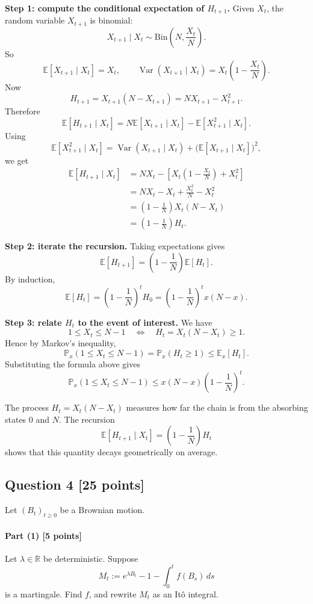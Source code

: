 \documentclass[11pt]{article}
\theoremstyle{definition}
\begin{document}
\textbf{Step 1: compute the conditional expectation of \(H_{t+1}\).}
Given \(X_t\), the random variable \(X_{t+1}\) is binomial:
\[
X_{t+1}\mid X_t \sim \mathrm{Bin}\!\left(N,\frac{X_t}{N}\right).
\]
So
\[
\mathbb E[X_{t+1}\mid X_t]=X_t,
\qquad
\operatorname{Var}(X_{t+1}\mid X_t)=X_t\left(1-\frac{X_t}{N}\right).
\]
Now
\[
H_{t+1}
=
X_{t+1}(N-X_{t+1})
=
N X_{t+1}-X_{t+1}^2.
\]
Therefore
\[
\mathbb E[H_{t+1}\mid X_t]
=
N\mathbb E[X_{t+1}\mid X_t]-\mathbb E[X_{t+1}^2\mid X_t].
\]
Using
\[
\mathbb E[X_{t+1}^2\mid X_t]
=
\operatorname{Var}(X_{t+1}\mid X_t)+\bigl(\mathbb E[X_{t+1}\mid X_t]\bigr)^2,
\]
we get
\begin{align*}
\mathbb E[H_{t+1}\mid X_t]
&=
N X_t-\left[X_t\left(1-\frac{X_t}{N}\right)+X_t^2\right] \\
&=
N X_t-X_t+\frac{X_t^2}{N}-X_t^2 \\
&=
\left(1-\frac1N\right)X_t(N-X_t) \\
&=
\left(1-\frac1N\right)H_t.
\end{align*}

\textbf{Step 2: iterate the recursion.}
Taking expectations gives
\[
\mathbb E[H_{t+1}]
=
\left(1-\frac1N\right)\mathbb E[H_t].
\]
By induction,
\[
\mathbb E[H_t]
=
\left(1-\frac1N\right)^t H_0
=
\left(1-\frac1N\right)^t x(N-x).
\]

\textbf{Step 3: relate \(H_t\) to the event of interest.}
We have
\[
1\le X_t\le N-1
\quad \Longleftrightarrow \quad
H_t=X_t(N-X_t)\ge 1.
\]
Hence by Markov's inequality,
\[
\mathbb P_x(1\le X_t\le N-1)
=
\mathbb P_x(H_t\ge 1)
\le
\mathbb E_x[H_t].
\]
Substituting the formula above gives
\[
\boxed{
\mathbb P_x(1\le X_t\le N-1)
\le
x(N-x)\left(1-\frac1N\right)^t.
}
\]

\begin{summarybox}
The process \(H_t=X_t(N-X_t)\) measures how far the chain is from the absorbing states \(0\) and \(N\). The recursion
\[
\mathbb E[H_{t+1}\mid X_t]=\left(1-\frac1N\right)H_t
\]
shows that this quantity decays geometrically on average.
\end{summarybox}

\subsection*{Question 4 \hfill [25 points]}
Let \((B_t)_{t\ge 0}\) be a Brownian motion.

\paragraph{Part (1) \hfill [5 points]}
Let \(\lambda\in \mathbb R\) be deterministic. Suppose
\[
M_t:=e^{\lambda B_t}-1-\int_0^t f(B_s)\,ds
\]
is a martingale. Find \(f\), and rewrite \(M_t\) as an It\^o integral.
\end{document}
